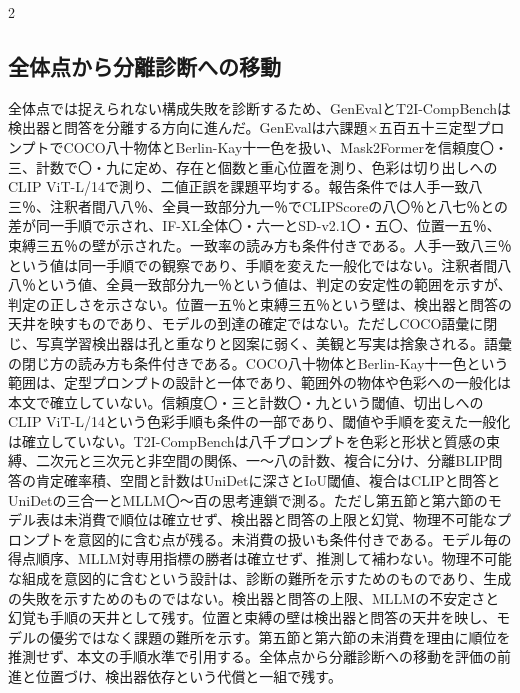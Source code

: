 \documentclass[lualatex,a4paper,10pt]{jlreq}
\begin{document}
\begin{multicols}{2}
\subsection{全体点から分離診断への移動}
全体点では捉えられない構成失敗を診断するため、GenEvalとT2I-CompBenchは検出器と問答を分離する方向に進んだ。GenEvalは六課題×五百五十三定型プロンプトでCOCO八十物体とBerlin-Kay十一色を扱い、Mask2Formerを信頼度〇・三、計数で〇・九に定め、存在と個数と重心位置を測り、色彩は切り出しへのCLIP ViT-L/14で測り、二値正誤を課題平均する\autocite{btd085}。報告条件では人手一致八三％、注釈者間八八％、全員一致部分九一％でCLIPScoreの八〇％と八七％との差が同一手順で示され、IF-XL全体〇・六一とSD-v2.1〇・五〇、位置一五％、束縛三五％の壁が示された\autocite{btd085}。一致率の読み方も条件付きである。人手一致八三％という値は同一手順での観察であり、手順を変えた一般化ではない。注釈者間八八％という値、全員一致部分九一％という値は、判定の安定性の範囲を示すが、判定の正しさを示さない。位置一五％と束縛三五％という壁は、検出器と問答の天井を映すものであり、モデルの到達の確定ではない\autocite{btd085}。ただしCOCO語彙に閉じ、写真学習検出器は孔と重なりと図案に弱く、美観と写実は捨象される\autocite{btd085}。語彙の閉じ方の読み方も条件付きである。COCO八十物体とBerlin-Kay十一色という範囲は、定型プロンプトの設計と一体であり、範囲外の物体や色彩への一般化は本文で確立していない。信頼度〇・三と計数〇・九という閾値、切出しへのCLIP ViT-L/14という色彩手順も条件の一部であり、閾値や手順を変えた一般化は確立していない\autocite{btd085}。T2I-CompBenchは八千プロンプトを色彩と形状と質感の束縛、二次元と三次元と非空間の関係、一〜八の計数、複合に分け、分離BLIP問答の肯定確率積、空間と計数はUniDetに深さとIoU閾値、複合はCLIPと問答とUniDetの三合一とMLLM〇〜百の思考連鎖で測る。ただし第五節と第六節のモデル表は未消費で順位は確立せず、検出器と問答の上限と幻覚、物理不可能なプロンプトを意図的に含む点が残る\autocite{btd086}。未消費の扱いも条件付きである。モデル毎の得点順序、MLLM対専用指標の勝者は確立せず、推測して補わない。物理不可能な組成を意図的に含むという設計は、診断の難所を示すためのものであり、生成の失敗を示すためのものではない。検出器と問答の上限、MLLMの不安定さと幻覚も手順の天井として残す\autocite{btd086}。位置と束縛の壁は検出器と問答の天井を映し、モデルの優劣ではなく課題の難所を示す。第五節と第六節の未消費を理由に順位を推測せず、本文の手順水準で引用する。全体点から分離診断への移動を評価の前進と位置づけ、検出器依存という代償と一組で残す\autocite{btd085,btd086}。


\end{multicols}
\end{document}
